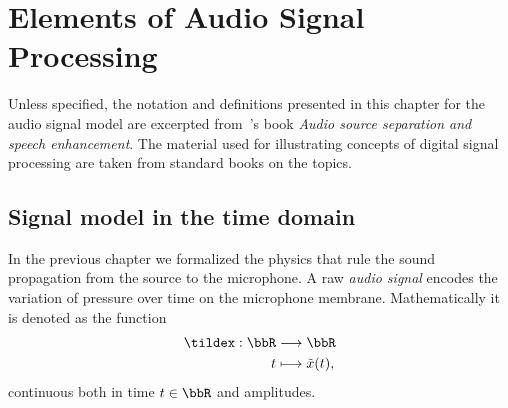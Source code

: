 \chapter{Elements of Audio Signal Processing}\label{ch:processing}
\vspace{-2.5em}
\synopsisChProcessing

\mynewline
Unless specified, the notation and definitions presented in this chapter for the audio signal model are excerpted from~\citeauthor{vincent2018audio}'s book \textit{Audio source separation and speech enhancement}.
The material used for illustrating concepts of digital signal processing are taken from standard books on the topics.

\section{Signal model in the time domain}\label{sec:processing:model}
In the previous chapter we formalized the physics that rule the sound propagation from the source to the microphone.
A raw \textit{audio signal} encodes the variation of pressure over time on the microphone membrane.
Mathematically it is denoted as the function
\begin{equation}
    \begin{aligned}
        \tildex : \bbR &\kto \bbR\\
                     t &\kmapsto \tilde{x}(t),
    \end{aligned}
\end{equation}
continuous both in time $t \in \R$ and amplitudes.

